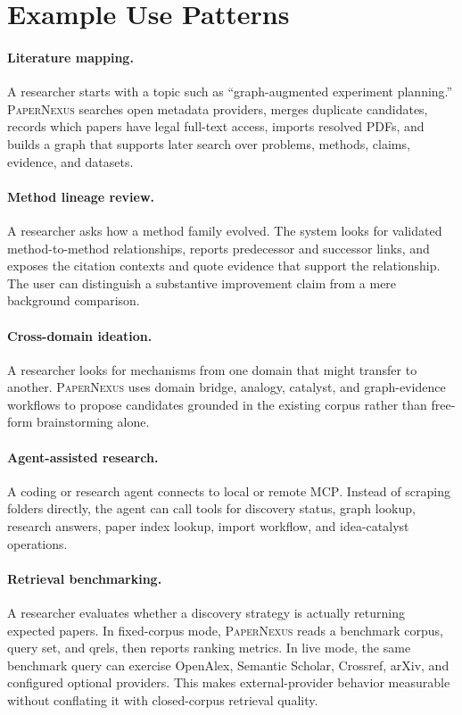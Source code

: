 \documentclass[11pt]{article}
\newcommand{\papernexus}{\textsc{PaperNexus}}
\newcommand{\mcp}{\textsc{MCP}}
\begin{document}
\section{Example Use Patterns}

\paragraph{Literature mapping.}
A researcher starts with a topic such as ``graph-augmented experiment planning.'' \papernexus{} searches open metadata providers, merges duplicate candidates, records which papers have legal full-text access, imports resolved PDFs, and builds a graph that supports later search over problems, methods, claims, evidence, and datasets.

\paragraph{Method lineage review.}
A researcher asks how a method family evolved. The system looks for validated method-to-method relationships, reports predecessor and successor links, and exposes the citation contexts and quote evidence that support the relationship. The user can distinguish a substantive improvement claim from a mere background comparison.

\paragraph{Cross-domain ideation.}
A researcher looks for mechanisms from one domain that might transfer to another. \papernexus{} uses domain bridge, analogy, catalyst, and graph-evidence workflows to propose candidates grounded in the existing corpus rather than free-form brainstorming alone.

\paragraph{Agent-assisted research.}
A coding or research agent connects to local or remote \mcp{}. Instead of scraping folders directly, the agent can call tools for discovery status, graph lookup, research answers, paper index lookup, import workflow, and idea-catalyst operations.

\paragraph{Retrieval benchmarking.}
A researcher evaluates whether a discovery strategy is actually returning expected papers. In fixed-corpus mode, \papernexus{} reads a benchmark corpus, query set, and qrels, then reports ranking metrics. In live mode, the same benchmark query can exercise OpenAlex, Semantic Scholar, Crossref, arXiv, and configured optional providers. This makes external-provider behavior measurable without conflating it with closed-corpus retrieval quality.
\end{document}
